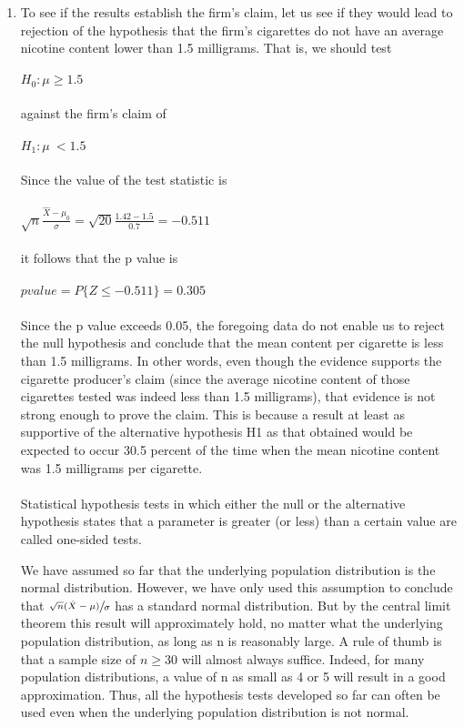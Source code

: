 \documentclass{book}
\begin{document}
\begin{enumerate}
    \item To see if the results establish the firm's claim, let us see if they would lead to rejection of the hypothesis that the firm's cigarettes do not have an average nicotine content lower than 1.5 milligrams. That is, we should test\\\\
    $H_0 : \mu \geq 1.5$\\\\
    against the firm's claim of\\\\
    $H_1 : \mu \ < 1.5$\\\\
    Since the value of the test statistic is\\\\
    $\sqrt{n}\frac{\hat{X} - \mu_0}{\sigma} = \sqrt{20}\frac{1.42 - 1.5}{0.7} = -0.511$\\\\
    it follows that the p value is\\\\
    $p value = P\{Z \leq -0.511\} = 0.305$\\\\
    Since the p value exceeds 0.05, the foregoing data do not enable us to reject the null hypothesis and conclude that the mean content per cigarette is less than 1.5 milligrams. In other words, even though the evidence supports the cigarette producer's claim (since the average nicotine content of those cigarettes tested was indeed less than 1.5 milligrams), that evidence is not strong enough to prove the claim. This is because a result at least as supportive of the alternative hypothesis H1 as that obtained would be expected to occur 30.5 percent of the time when the mean nicotine content was 1.5 milligrams per cigarette.\\\\
Statistical hypothesis tests in which either the null or the alternative hypothesis states that a parameter is greater (or less) than a certain value are called one-sided tests.

We have assumed so far that the underlying population distribution is the normal distribution. However, we have only used this assumption to conclude that $\sfrac{\sqrt{n}(\hat{X} - \mu)}{\sigma}$  has a standard normal distribution. But by the central limit theorem this result will approximately hold, no matter what the underlying population distribution, as long as n is reasonably large. A rule of thumb is that a sample size of $n \geq 30$ will almost always suffice. Indeed, for many population distributions, a value of n as small as 4 or 5 will result in a good approximation. Thus, all the hypothesis tests developed so far can often be used even when the underlying population distribution is not normal.
\end{enumerate}
\end{document}
